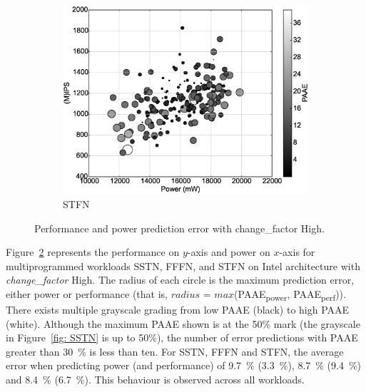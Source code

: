 \begin{figure}[tb!]
\begin{subfigure}{0.32\textwidth}
        \centering
        \includegraphics[width=\textwidth]{Chapter3/Figs/scatter/STFN.eps}
        \caption{STFN}  
        \label{fig: STFN}
    \end{subfigure}
    \caption[PAAE for workloads SSTN, FFFN and STFN on Intel]{ Performance and power prediction error with change\_factor High.}
    \label{fig: REPPH result}
\end{figure}

 Figure~\ref{fig: REPPH result} represents the performance on $y$-axis and
power on $x$-axis for multiprogrammed workloads SSTN, FFFN, and STFN on Intel architecture
with \textit{change\_factor} High. The radius of each circle is the maximum prediction
error, either power or performance (that is, $radius$ = $max$(PAAE\textsubscript{power},
PAAE\textsubscript{perf})). There exists multiple grayscale grading from low PAAE (black)
to high PAAE (white). Although the maximum PAAE shown is at the 50\% mark (the grayscale
in Figure~\ref{fig: SSTN} is up to 50\%), the number of error predictions with PAAE
greater than \SI{30}{\percent} is less than ten. For SSTN, FFFN and STFN, the average
error when predicting power (and performance) of \SI{9.7}{\percent} (\SI{3.3}{\percent}),
\SI{8.7}{\percent} (\SI{9.4}{\percent}) and \SI{8.4}{\percent} (\SI{6.7}{\percent}). This
behaviour is observed across all workloads.

